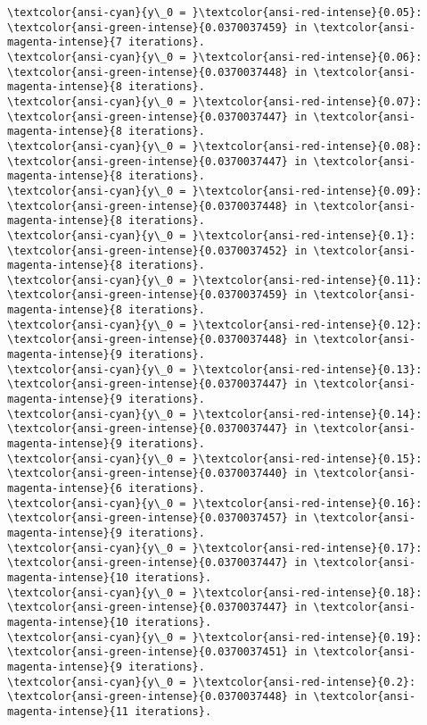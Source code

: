 \documentclass[11pt]{article}
\begin{document}
    \begin{Verbatim}[commandchars=\\\{\}]
\textcolor{ansi-cyan}{y\_0 = }\textcolor{ansi-red-intense}{0.05}:  \textcolor{ansi-green-intense}{0.0370037459} in \textcolor{ansi-magenta-intense}{7 iterations}.
\textcolor{ansi-cyan}{y\_0 = }\textcolor{ansi-red-intense}{0.06}:  \textcolor{ansi-green-intense}{0.0370037448} in \textcolor{ansi-magenta-intense}{8 iterations}.
\textcolor{ansi-cyan}{y\_0 = }\textcolor{ansi-red-intense}{0.07}:  \textcolor{ansi-green-intense}{0.0370037447} in \textcolor{ansi-magenta-intense}{8 iterations}.
\textcolor{ansi-cyan}{y\_0 = }\textcolor{ansi-red-intense}{0.08}:  \textcolor{ansi-green-intense}{0.0370037447} in \textcolor{ansi-magenta-intense}{8 iterations}.
\textcolor{ansi-cyan}{y\_0 = }\textcolor{ansi-red-intense}{0.09}:  \textcolor{ansi-green-intense}{0.0370037448} in \textcolor{ansi-magenta-intense}{8 iterations}.
\textcolor{ansi-cyan}{y\_0 = }\textcolor{ansi-red-intense}{0.1}:  \textcolor{ansi-green-intense}{0.0370037452} in \textcolor{ansi-magenta-intense}{8 iterations}.
\textcolor{ansi-cyan}{y\_0 = }\textcolor{ansi-red-intense}{0.11}:  \textcolor{ansi-green-intense}{0.0370037459} in \textcolor{ansi-magenta-intense}{8 iterations}.
\textcolor{ansi-cyan}{y\_0 = }\textcolor{ansi-red-intense}{0.12}:  \textcolor{ansi-green-intense}{0.0370037448} in \textcolor{ansi-magenta-intense}{9 iterations}.
\textcolor{ansi-cyan}{y\_0 = }\textcolor{ansi-red-intense}{0.13}:  \textcolor{ansi-green-intense}{0.0370037447} in \textcolor{ansi-magenta-intense}{9 iterations}.
\textcolor{ansi-cyan}{y\_0 = }\textcolor{ansi-red-intense}{0.14}:  \textcolor{ansi-green-intense}{0.0370037447} in \textcolor{ansi-magenta-intense}{9 iterations}.
\textcolor{ansi-cyan}{y\_0 = }\textcolor{ansi-red-intense}{0.15}:  \textcolor{ansi-green-intense}{0.0370037440} in \textcolor{ansi-magenta-intense}{6 iterations}.
\textcolor{ansi-cyan}{y\_0 = }\textcolor{ansi-red-intense}{0.16}:  \textcolor{ansi-green-intense}{0.0370037457} in \textcolor{ansi-magenta-intense}{9 iterations}.
\textcolor{ansi-cyan}{y\_0 = }\textcolor{ansi-red-intense}{0.17}:  \textcolor{ansi-green-intense}{0.0370037447} in \textcolor{ansi-magenta-intense}{10 iterations}.
\textcolor{ansi-cyan}{y\_0 = }\textcolor{ansi-red-intense}{0.18}:  \textcolor{ansi-green-intense}{0.0370037447} in \textcolor{ansi-magenta-intense}{10 iterations}.
\textcolor{ansi-cyan}{y\_0 = }\textcolor{ansi-red-intense}{0.19}:  \textcolor{ansi-green-intense}{0.0370037451} in \textcolor{ansi-magenta-intense}{9 iterations}.
\textcolor{ansi-cyan}{y\_0 = }\textcolor{ansi-red-intense}{0.2}:  \textcolor{ansi-green-intense}{0.0370037448} in \textcolor{ansi-magenta-intense}{11 iterations}.

\end{Verbatim}
\end{document}
